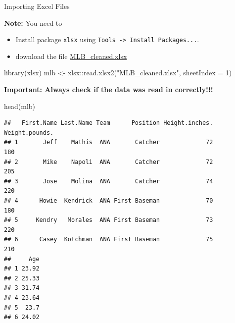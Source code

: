 \documentclass[
  9pt,
  ignorenonframetext,
]{beamer}
\newenvironment{Shaded}{\begin{snugshade}}{\end{snugshade}}
\newcommand{\DataTypeTok}[1]{\textcolor[rgb]{0.87,0.87,0.75}{#1}}
\newcommand{\DecValTok}[1]{\textcolor[rgb]{0.86,0.86,0.80}{#1}}
\newcommand{\KeywordTok}[1]{\textcolor[rgb]{0.94,0.87,0.69}{#1}}
\newcommand{\NormalTok}[1]{\textcolor[rgb]{0.80,0.80,0.80}{#1}}
\newcommand{\OperatorTok}[1]{\textcolor[rgb]{0.94,0.94,0.82}{#1}}
\newcommand{\StringTok}[1]{\textcolor[rgb]{0.80,0.58,0.58}{#1}}
\providecommand{\tightlist}{%
  \setlength{\itemsep}{0pt}\setlength{\parskip}{0pt}}
\begin{document}
\begin{frame}[fragile]{Importing Excel Files}
\protect\hypertarget{importing-excel-files}{}
\footnotesize

\textbf{Note:} You need to

\begin{itemize}
\tightlist
\item
  Install package \texttt{xlsx} using
  \texttt{Tools\ -\textgreater{}\ Install\ Packages...}.
\item
  download the file
  \href{https://michael.hahsler.net/SMU/DS_Workshop_Intro_R/slides/MLB_cleaned.xlsx}{MLB\_cleaned.xlsx}
\end{itemize}

\vfill

\begin{Shaded}
\begin{Highlighting}[]
\KeywordTok{library}\NormalTok{(xlsx)}
\NormalTok{mlb \textless{}{-}}\StringTok{ }\NormalTok{xlsx}\OperatorTok{::}\KeywordTok{read.xlsx2}\NormalTok{(}\StringTok{"MLB\_cleaned.xlsx"}\NormalTok{, }\DataTypeTok{sheetIndex =} \DecValTok{1}\NormalTok{)}
\end{Highlighting}
\end{Shaded}

\vfill

\textbf{Important: Always check if the data was read in correctly!!!}

\vfill

\begin{Shaded}
\begin{Highlighting}[]
\KeywordTok{head}\NormalTok{(mlb)}
\end{Highlighting}
\end{Shaded}

\begin{verbatim}
##   First.Name Last.Name Team      Position Height.inches. Weight.pounds.
## 1       Jeff    Mathis  ANA       Catcher             72            180
## 2       Mike    Napoli  ANA       Catcher             72            205
## 3       Jose    Molina  ANA       Catcher             74            220
## 4      Howie  Kendrick  ANA First Baseman             70            180
## 5     Kendry   Morales  ANA First Baseman             73            220
## 6      Casey  Kotchman  ANA First Baseman             75            210
##     Age
## 1 23.92
## 2 25.33
## 3 31.74
## 4 23.64
## 5  23.7
## 6 24.02
\end{verbatim}
\end{frame}
\end{document}
